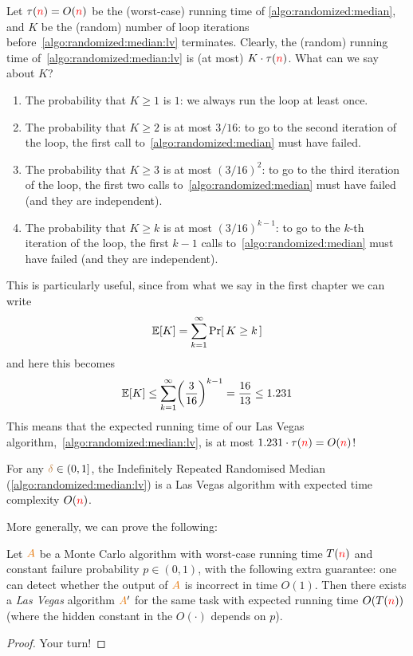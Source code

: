 Let $\tau({\textcolor{red}{n}}) = O({\textcolor{red}{n}})$ be the (worst-case) running time of \cref{algo:randomized:median}, and $K$ be the (random) number of loop iterations before~\cref{algo:randomized:median:lv} terminates. Clearly, the (random) running time of~\cref{algo:randomized:median:lv} is (at most) $K\cdot \tau({\textcolor{red}{n}})$. What can we say about $K$?
\begin{enumerate}
    \item The probability that $K\geq 1$ is $1$: we always run the loop at least once.
    \item The probability that $K\geq 2$ is at most $3/16$: to go to the second iteration of the loop, the first call to~\cref{algo:randomized:median} must have failed.
    \item The probability that $K\geq 3$ is at most $(3/16)^2$: to go to the third iteration of the loop, the first two calls to~\cref{algo:randomized:median} must have failed (and they are independent).
    \item The probability that $K\geq k$ is at most $(3/16)^{k-1}$: to go to the $k$-th iteration of the loop, the first $k-1$ calls to~\cref{algo:randomized:median} must have failed (and they are independent).
\end{enumerate}
This is particularly useful, since from what we say in the first chapter we can write
\[
    \expect{K} = \sum_{k=1}^\infty \probaOf{K\geq k} 
\]
and here this becomes
\[
    \expect{K} \leq \sum_{k=1}^\infty \Paren{\frac{3}{16}}^{k-1} = \frac{16}{13} \leq  1.231
\]
This means that the expected running time of our Las Vegas algorithm,~\cref{algo:randomized:median:lv}, is at most $1.231\cdot \tau({\textcolor{red}{n}}) = O({\textcolor{red}{n}})$!
\begin{corollary}
    \label{coro:randomized:median:lv}
    For any ${\textcolor{brown}{\delta}} \in(0,1]$, the Indefinitely Repeated Randomised Median (\cref{algo:randomized:median:lv}) is a Las Vegas algorithm with expected time complexity $O({\textcolor{red}{n}})$.
\end{corollary}
\noindent More generally, we can prove the following:
\begin{theorem}
    Let $\Algo$ be a Monte Carlo algorithm with worst-case running time $T({\textcolor{red}{n}})$ and constant failure probability $p\in(0,1)$, with the following extra guarantee: one can detect whether the output of $\Algo$ is incorrect in time $O(1)$. Then there exists a \emph{Las Vegas} algorithm $\Algo'$ for the same task with expected running time $O(T({\textcolor{red}{n}}))$ (where the hidden constant in the $O(\cdot)$ depends on $p$).
\end{theorem}
\begin{proof}
    Your turn!
\end{proof}


